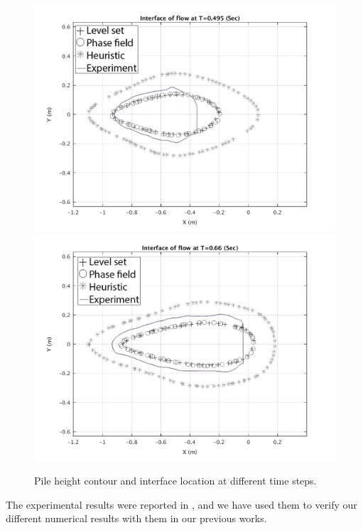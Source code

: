\documentclass[letterpaper,10pt]{article}
\begin{document}
\begin{figure}[H]
\begin{minipage}[b]{.5\linewidth}
        \end{minipage}
        \begin{minipage}[b]{.5 \linewidth}
                \centering
                \includegraphics[width=1\textwidth]{IMAGES/interface495.png}
                \includegraphics[width=1\textwidth]{IMAGES/interface660.png}
        \end{minipage}
        \caption{Pile height contour and interface location at different time steps.}
        \label{Pile_height_contour}
\end{figure}
The experimental results were reported in \cite{AmyWebb2004}, and we have used them to verify our different numerical results with them in our previous works. 
\end{document}
